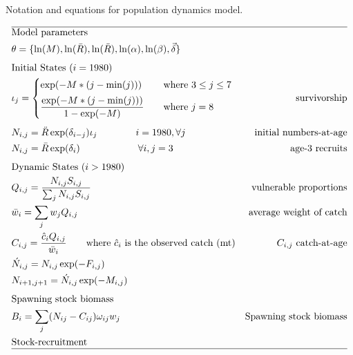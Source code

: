 \documentclass[12pt,letterpaper]{article}
\newcounter{saveEq}
\def\putEq{\setcounter{saveEq}{\value{equation}}}
\def\getEq{\setcounter{equation}{\value{saveEq}}}
\def\tableEq{ %
    \putEq \setcounter{equation}{0}
    \renewcommand{\theequation}{T\arabic{table}.\arabic{equation}}
    \vspace{-5mm}
    }
\def\normalEq{ %
    \getEq
    \renewcommand{\theequation}{\arabic{section}.\arabic{equation}}}
\begin{document}
  \begin{table}[h]
    \centering
    \caption{Notation and equations for population dynamics model.}
    \label{tab:PopulationDynamics}
    \tableEq
    \begin{align}
      \hline \nonumber
      & \mbox{Model parameters} & \nonumber\\
      & \theta = \{\ln(M),\ln(\bar{R}),\ln(\ddot{R}), 
        \ln(\alpha),\ln(\beta),\vec{\delta} \} \\[1ex]
      & \mbox{Initial States ($i=1980$)} \nonumber \\
      & \iota_j = \begin{cases}
          \exp(-M*(j-\mbox{min}(j))) & \quad \mbox{where } 3 \leq j \leq 7 \\[1ex]
          \dfrac{\exp(-M*(j-\mbox{min}(j)))}{1-\exp(-M)} & \quad \mbox{where } j=8 \\
          \end{cases} & \mbox{survivorship} \label{eq.survivorship}\\[1ex]
      & N_{i,j} = \ddot{R} \exp(\delta_{i-j}) \iota_j \qquad \qquad  i=1980,\forall j & \mbox{initial numbers-at-age} \label{eq.initialnumbersatage} \\
      & N_{i,j} = \bar{R} \exp(\delta_i) \qquad  \quad \qquad \quad \forall i, j=3 & \mbox{age-3 recruits} \label{eq.initialrecruits} \\[1ex]
      & \mbox{Dynamic States ($i > 1980$)} \nonumber\\
      & Q_{i,j} = \frac{N_{i,j} S_{i,j}}{\sum_j N_{i,j} S_{i,j}} &\mbox{vulnerable proportions} \label{eq.predQij} \\
      & \bar{w}_i  = \sum_j w_j  Q_{i,j} &\mbox{average weight of catch} \\
      & C_{i,j} = \frac{\hat{c}_{i}Q_{i,j}}{\bar{w}_i} \qquad \mbox{where $\hat{c}_i$ is the observed catch (mt)} &\mbox{$C_{i,j}$ catch-at-age} \\
      & \acute{N}_{i,j} = N_{i,j} \exp(-F_{i,j}) \\
      & N_{i+1,j+1} = \acute{N}_{i,j} \exp(-M_{i,j}) \\[1ex]
      & \mbox{Spawning stock biomass} \nonumber\\
      & B_{i} = \sum_j (N_{ij}-C_{ij}) \omega_{ij} w_j & \mbox{Spawning stock biomass} \label{eq.ssb}\\
      & \mbox{Stock-recruitment} \nonumber\\
      \hline \nonumber
    \end{align}
    \normalEq
  \end{table}
\end{document}
